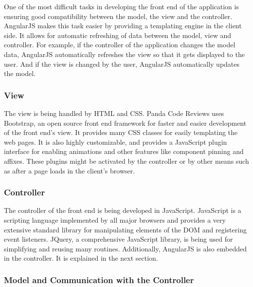 One of the most difficult tasks in developing the front end of the application
is ensuring good compatibility between the model, the view and the controller.
AngularJS makes this task easier by providing a templating engine in the client
side. It allows for automatic refreshing of data between the model, view and
controller. For example, if the controller of the application changes the model
data, AngularJS automatically refreshes the view so that it gets displayed to
the user. And if the view is changed by the user, AngularJS automatically
updates the model.

\subsubsection{View}

The view is being handled by HTML and CSS. Panda Code Reviews uses Bootstrap, an
open source front end framework for faster and easier development of the front
end's view. It provides many CSS classes for easily templating the web pages. It
is also highly customizable, and provides a JavaScript plugin interface for
enabling animations and other features like component pinning and affixes. These
plugins might be activated by the controller or by other means such as after a
page loads in the client's browser.

\subsubsection{Controller}

The controller of the front end is being developed in JavaScript. JavaScript is
a scripting language implemented by all major browsers and provides a very
extensive standard library for manipulating elements of the DOM and registering
event listeners. JQuery, a comprehensive JavaScript library, is being used for
simplifying and reusing many routines. Additionally, AngularJS is also embedded
in the controller. It is explained in the next section.

\subsubsection{Model and Communication with the Controller}

